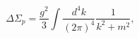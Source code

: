 \begin{equation}
 \Delta\Sigma_p = \frac{g^2}3
 \int \frac{d^4k}{(2\pi)^4} \frac1{k^2+m^2},
\end{equation}

